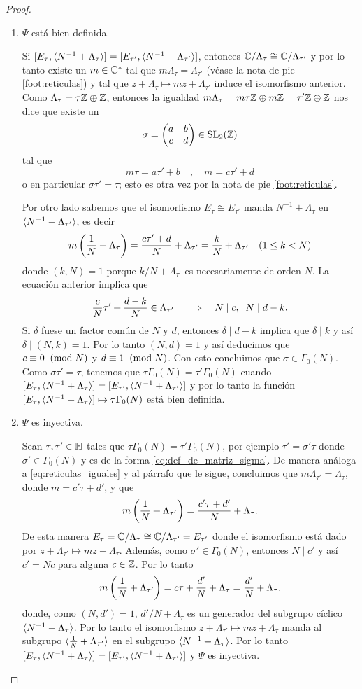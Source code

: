 \documentclass[../../tesis_maestria]{subfiles}
\begin{document}
\begin{proof}
\begin{enumerate}[label=\emph{\roman*})]
  \item $\Psi$ está bien definida.
  
  \-\;\;Si $[E_\tau,\langle N^{-1}+\Lambda_\tau \rangle]=[E_{\tau'},\langle N^{-1}+\Lambda_{\tau'} \rangle]$, entonces $\mathbb{C}/\Lambda_\tau\cong\mathbb{C}/\Lambda_{\tau'}$ y por lo tanto existe un $m\in\mathbb{C}^*$ tal que $m\Lambda_\tau=\Lambda_{\tau'}$ (véase la nota de pie \ref{foot:reticulas}) y tal que $z+\Lambda_\tau\mapsto mz+\Lambda_{\tau'}$ induce el isomorfismo anterior. Como $\Lambda_\tau=\tau\mathbb{Z}\oplus\mathbb{Z}$, entonces la igualdad $m\Lambda_\tau=m\tau\mathbb{Z}\oplus m\mathbb{Z}=\tau'\mathbb{Z}\oplus\mathbb{Z}$ nos dice que existe un
\[
	\sigma=\begin{pmatrix}a & b\\ c & d\end{pmatrix}\in\mathrm{SL}_2(\mathbb{Z})
\]
tal que
\[
	m\tau=a\tau'+b\quad,\quad m=c\tau'+d
\]
o en particular $\sigma\tau'=\tau$; esto es otra vez por la nota de pie \ref{foot:reticulas}.

  \-\;\; Por otro lado sabemos que el isomorfismo $E_\tau\cong E_{\tau'}$ manda $N^{-1}+\Lambda_\tau$ en $\langle N^{-1}+\Lambda_{\tau'} \rangle$, es decir
\[
	m\left( \frac{1}{N}+\Lambda_\tau \right)=\frac{c\tau'+d}{N}+\Lambda_{\tau'}=\frac{k}{N}+\Lambda_{\tau'}\quad (1\leq k< N)
\]
donde $(k,N)=1$ porque $k/N+\Lambda_{\tau'}$ es necesariamente de orden $N$. La ecuación anterior implica que
\[
	\frac{c}{N}\tau'+\frac{d-k}{N}\in\Lambda_{\tau'}\quad\Longrightarrow\quad N\mid c,\;\; N\mid d-k.
\]
Si $\delta$ fuese un factor común de $N$ y $d$, entonces $\delta\mid d-k$ implica que $\delta\mid k$ y así $\delta\mid(N,k)=1$. Por lo tanto $(N,d)=1$ y así deducimos que $c\equiv0\;\;(\mathrm{mod}\; N)$ y $d\equiv1\;\;(\mathrm{mod}\; N)$. Con esto concluimos que $\sigma\in\Gamma_0(N)$. Como $\sigma\tau'=\tau$, tenemos que $\tau\Gamma_0(N)=\tau'\Gamma_0(N)$ cuando $[E_\tau,\langle N^{-1}+\Lambda_\tau \rangle]=[E_{\tau'},\langle N^{-1}+\Lambda_{\tau'} \rangle]$ y por lo tanto la función $[E_\tau,\langle N^{-1}+\Lambda_\tau \rangle]\mapsto\tau\Gamma_0(N)$ está bien definida.

  \item $\Psi$ es inyectiva.
  
  \-\;\; Sean $\tau,\tau'\in\mathbb{H}$ tales que $\tau\Gamma_0(N)=\tau'\Gamma_0(N)$, por ejemplo $\tau'=\sigma'\tau$ donde $\sigma'\in\Gamma_0(N)$ y es de la forma \eqref{eq:def_de_matriz_sigma}. De manera análoga a \eqref{eq:reticulas_iguales} y al párrafo que le sigue, concluimos que $m\Lambda_{\tau'}=\Lambda_{\tau}$, donde $m=c'\tau+d'$, y que
  \[
  	m\left( \frac{1}{N}+\Lambda_{\tau'} \right)=\frac{c'\tau+d'}{N}+\Lambda_\tau.
  \]
De esta manera $E_\tau=\mathbb{C}/\Lambda_\tau\cong\mathbb{C}/\Lambda_{\tau'}=E_{\tau'}$ donde el isomorfismo está dado por $z+\Lambda_{\tau'}\mapsto mz+\Lambda_{\tau}$. Además, como $\sigma'\in\Gamma_0(N)$, entonces $N\mid c'$ y así $c'=Nc$ para alguna $c\in\mathbb{Z}$. Por lo tanto
\[
  m\left( \frac{1}{N}+\Lambda_{\tau'} \right)=c\tau+\frac{d'}{N}+\Lambda_\tau=\frac{d'}{N}+\Lambda_\tau,
\]
donde, como $(N,d')=1$, $d'/N+\Lambda_\tau$ es un generador del subgrupo cíclico $\langle N^{-1}+\Lambda_\tau \rangle$. Por lo tanto el isomorfismo $z+\Lambda_{\tau'}\mapsto mz+\Lambda_{\tau}$ manda al subgrupo $\langle \frac{1}{N}+\Lambda_{\tau'} \rangle$ en el subgrupo $\langle N^{-1}+\Lambda_\tau \rangle$. Por lo tanto $[E_\tau,\langle N^{-1}+\Lambda_\tau \rangle]=[E_{\tau'},\langle N^{-1}+\Lambda_{\tau'} \rangle]$ y $\Psi$ es inyectiva.


\end{enumerate}
\end{proof}
\end{document}
